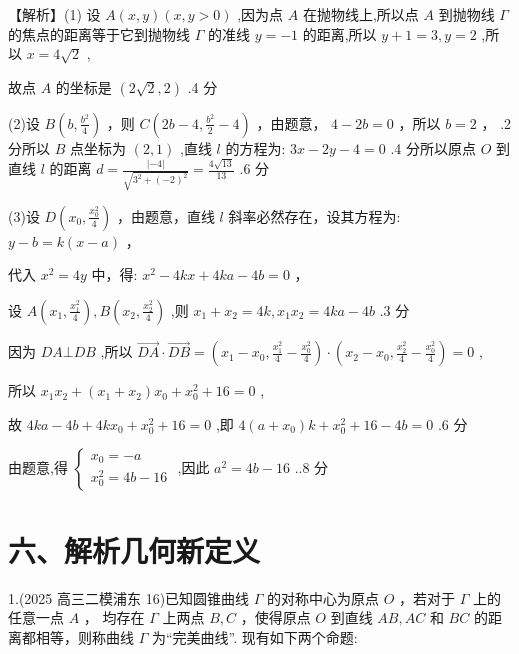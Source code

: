 \documentclass[10pt]{article}
\begin{document}
【解析】(1) 设 \(A\left( {x,y}\right) \left( {x,y > 0}\right)\) ,因为点 \(A\) 在抛物线上,所以点 \(A\) 到抛物线 \(\Gamma\) 的焦点的距离等于它到抛物线 \(\Gamma\) 的准线 \(y =  - 1\) 的距离,所以 \(y + 1 = 3,y = 2\) ,所以 \(x = 4\sqrt{2}\) ,

故点 \(A\) 的坐标是 \(\left( {2\sqrt{2},2}\right)\) .4 分

(2)设 \(B\left( {b,\frac{{b}^{2}}{4}}\right)\) ，则 \(C\left( {{2b} - 4,\frac{{b}^{2}}{2} - 4}\right)\) ，由题意， \(4 - {2b} = 0\) ，所以 \(b = 2\) ， .2 分所以 \(B\) 点坐标为 \(\left( {2,1}\right)\) ,直线 \(l\) 的方程为: \({3x} - {2y} - 4 = 0\) .4 分所以原点 \(O\) 到直线 \(l\) 的距离 \(d = \frac{\left| -4\right| }{\sqrt{{3}^{2} + {\left( -2\right) }^{2}}} = \frac{4\sqrt{13}}{13}\) .6 分

(3)设 \(D\left( {{x}_{0},\frac{{x}_{0}^{2}}{4}}\right)\) ，由题意，直线 \(l\) 斜率必然存在，设其方程为: \(y - b = k\left( {x - a}\right)\) ，

代入 \({x}^{2} = {4y}\) 中，得: \({x}^{2} - {4kx} + {4ka} - {4b} = 0\) ，

设 \(A\left( {{x}_{1},\frac{{x}_{1}^{2}}{4}}\right) ,B\left( {{x}_{2},\frac{{x}_{2}^{2}}{4}}\right)\) ,则 \({x}_{1} + {x}_{2} = {4k},{x}_{1}{x}_{2} = {4ka} - {4b}\) .3 分

因为 \({DA} \bot  {DB}\) ,所以 \(\overrightarrow{DA} \cdot  \overrightarrow{DB} = \left( {{x}_{1} - {x}_{0},\frac{{x}_{1}^{2}}{4} - \frac{{x}_{0}^{2}}{4}}\right)  \cdot  \left( {{x}_{2} - {x}_{0},\frac{{x}_{2}^{2}}{4} - \frac{{x}_{0}^{2}}{4}}\right)  = 0\) ,

所以 \({x}_{1}{x}_{2} + \left( {{x}_{1} + {x}_{2}}\right) {x}_{0} + {x}_{0}^{2} + {16} = 0\) ,

故 \({4ka} - {4b} + {4k}{x}_{0} + {x}_{0}^{2} + {16} = 0\) ,即 \(4\left( {a + {x}_{0}}\right) k + {x}_{0}^{2} + {16} - {4b} = 0\) .6 分

由题意,得 \(\left\{  \begin{array}{l} {x}_{0} =  - a \\  {x}_{0}^{2} = {4b} - {16} \end{array}\right.\) ,因此 \({a}^{2} = {4b} - {16}\) ..8 分

\section*{六、解析几何新定义}

1.(2025 高三二模浦东 16)已知圆锥曲线 \(\Gamma\) 的对称中心为原点 \(O\) ，若对于 \(\Gamma\) 上的任意一点 \(A\) ， 均存在 \(\Gamma\) 上两点 \(B,C\) ，使得原点 \(O\) 到直线 \({AB},{AC}\) 和 \({BC}\) 的距离都相等，则称曲线 \(\Gamma\) 为“完美曲线”. 现有如下两个命题:
\end{document}
